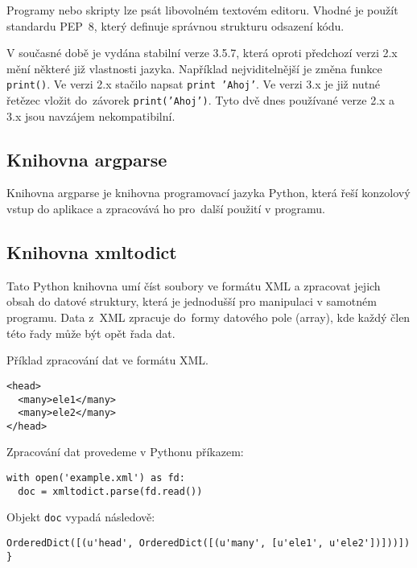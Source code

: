 Programy nebo skripty lze psát libovolném textovém editoru. Vhodné je
použít standardu PEP~8, který definuje správnou strukturu odsazení kódu.

V současné době je vydána stabilní verze 3.5.7, která oproti předchozí
verzi 2.x mění některé již  vlastnosti jazyka. Například 
nejviditelnější je změna funkce {\tt print()}. Ve verzi 2.x stačilo napsat
 {\tt print 'Ahoj'}. Ve verzi 3.x je již nutné řetězec vložit
do~závorek  {\tt print('Ahoj')}. Tyto dvě dnes používané verze 2.x
a 3.x jsou navzájem nekompatibilní.
\cite{python} 
\cite{wikiPython} 
  
\subsection{Knihovna argparse}
\label{argparse} 
Knihovna argparse je knihovna 
programovací jazyka Python, která řeší konzolový vstup do aplikace a 
zpracovává ho pro~další použití v programu.\cite{argparse}

\subsection{Knihovna xmltodict}
\label{xmltodict} 
Tato Python knihovna umí číst soubory ve formátu XML a zpracovat jejich obsah do datové struktury, která je jednodušší pro manipulaci v samotném
programu. Data z~XML zpracuje do~formy datového pole (array), kde každý
člen této řady může být opět řada dat.\cite{xmltodict}

Příklad zpracování dat ve formátu XML.

{\scriptsize
\begin{lstlisting}
<head>
  <many>ele1</many>
  <many>ele2</many>
</head>
\end{lstlisting}
}

Zpracování dat provedeme v Pythonu příkazem:

{\scriptsize
\lstset{language=Python}
\begin{lstlisting}
with open('example.xml') as fd: 
  doc = xmltodict.parse(fd.read()) 
\end{lstlisting}
}

Objekt {\tt doc} vypadá následově:

{\scriptsize
\lstset{language=Python}
\begin{lstlisting}
OrderedDict([(u'head', OrderedDict([(u'many', [u'ele1', u'ele2'])]))]) }
\end{lstlisting}
}

